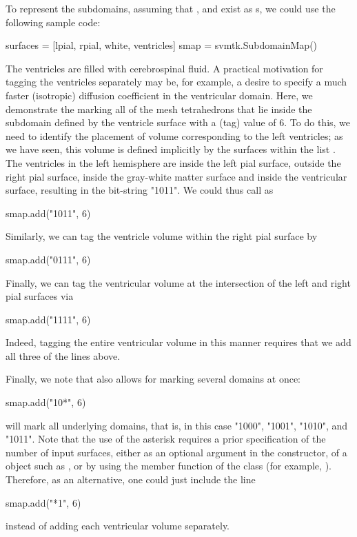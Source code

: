 To represent the subdomains, assuming that , and  exist as
s, we could use the following sample code:
\begin{python} 
surfaces = [lpial, rpial, white, ventricles]
smap = svmtk.SubdomainMap()
\end{python}
The ventricles are filled with cerebrospinal fluid.  A practical motivation for 
tagging the ventricles separately may be, for example, a desire to specify a 
much faster (isotropic) diffusion coefficient in the ventricular domain.  Here, 
we demonstrate the marking all of the mesh tetrahedrons that lie inside the 
subdomain defined by the ventricle surface with a (tag) value of 6. To do this, %
we need to identify the placement of volume corresponding to the left 
ventricles; as we have seen, this volume is defined implicitly by the surfaces 
within the list .  The ventricles in the left hemisphere are inside the left 
pial surface, outside the right pial surface, inside the gray-white matter 
surface and inside the ventricular surface, resulting in the bit-string "1011". 
We could thus call  as 
\begin{python}
smap.add("1011", 6)
\end{python}
Similarly, we can tag the ventricle volume within the right pial
surface by
\begin{python}
smap.add("0111", 6)
\end{python}
Finally, we can tag the ventricular volume at the intersection of the
left and right pial surfaces via
\begin{python}
smap.add("1111", 6)
\end{python}
Indeed, tagging the entire ventricular volume in this manner requires that we add all
three of the lines above.

Finally, we note that {\svmtk} also allows for marking several
domains at once:
\begin{python}
smap.add("10*", 6)
\end{python}
will mark all underlying domains, that is, in this case "1000", "1001",
"1010", and "1011".  Note that the use of the asterisk requires a
prior specification of the number of input surfaces, either as an
optional argument in the constructor, of a  object 
such as , or by using the member function 
 of the  
class (for example,  ). Therefore, 
as an alternative, one could just include the line
\begin{python}
smap.add("*1", 6)
\end{python}
instead of adding each ventricular volume separately.

